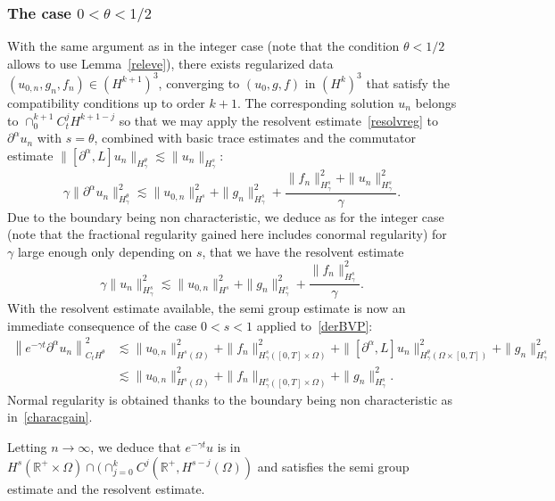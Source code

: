 \documentclass[10pt]{amsart}
\theoremstyle{definition}\newtheorem{defi}[theo]{Definition}\newtheorem{rema}[theo]{Remark}\newtheorem{exam}[theo]{Example}\newtheorem{exem}[theo]{Example}\newtheorem{nota}[theo]{Notation}
\newcommand{\R}{\mathbb{R}}
\begin{document}
\subsubsection{The case $0<\theta<1/2$}
With the same argument as in the integer case (note that the condition $\theta<1/2$ allows to use Lemma~\ref{releve}), there exists regularized data $(u_{0,n},g_n,f_n)\in (H^{k+1})^3$, converging to $(u_0,g,f)$ in $(H^k)^3$ that satisfy the compatibility conditions up to order $k+1$. The corresponding solution $u_n$ belongs to $\cap_0^{k+1} C_t^jH^{k+1-j}$ so that we may apply the resolvent estimate~\eqref{resolvreg} to $\partial^\alpha u_n$ with $s=\theta$, combined with basic trace estimates and the commutator estimate $\|[\partial^\alpha,L]u_n\|_{H^\theta_\gamma}\lesssim
\|u_n\|_{H^s_\gamma}$:
\begin{equation}\label{keyresolv}
\gamma\|\partial^\alpha u_n\|_{H^\theta_\gamma}^2 \lesssim \|u_{0,n}\|_{H^s}^2+\|g_n\|_{H^s_\gamma}^2 +\frac{\|f_n\|_{H^s_\gamma}^2+
\|u_n\|_{H^s_\gamma}^2}{\gamma}.
\end{equation}
Due to the boundary being non characteristic, we deduce as for the integer case (note that the fractional regularity gained here includes conormal regularity) for $\gamma$ large enough only depending on $s$, that we have the resolvent estimate
\[
\gamma \|u_n\|_{H^s_\gamma}^2
\lesssim \|u_{0,n}\|^2_{H^s}+\|g_n\|_{H^s_\gamma}^2+
\frac{\|f_n\|_{H^s_\gamma }^2}{\gamma}.
\]
With the resolvent estimate available, the semi group estimate is now an immediate consequence of the case $0<s<1$ applied to~\eqref{derBVP}:
\begin{align*}
\left\|e^{-\gamma t} \partial^\alpha u_n\right\|_{C_tH^\theta}^2&\lesssim
\|u_{0,n}\|_{H^s(\Omega)}^2 +\|f_n\|_{H^s_\gamma([0,T]\times \Omega)}^2 +\|[\partial^\alpha,L]u_n\|_{H^\theta_\gamma(\Omega\times [0,T])}^2 +\|g_n\|_{H^s_\gamma}^2
\\
&\lesssim
\|u_{0,n}\|_{H^s(\Omega)}^2 +\|f_n\|_{H^s_\gamma([0,T]\times \Omega)} +\|g_n\|_{H^s_\gamma}^2.
\end{align*}
Normal regularity is obtained thanks to the boundary being non characteristic as in~\eqref{characgain}. 


Letting $n\to \infty$, we deduce that $e^{-\gamma t}u$ is in $H^s(\R^+\times \Omega)\cap (\cap_{j=0}^kC^j(\R^+,H^{s-j}(\Omega))$ and satisfies the semi group estimate and the resolvent estimate.
\end{document}
